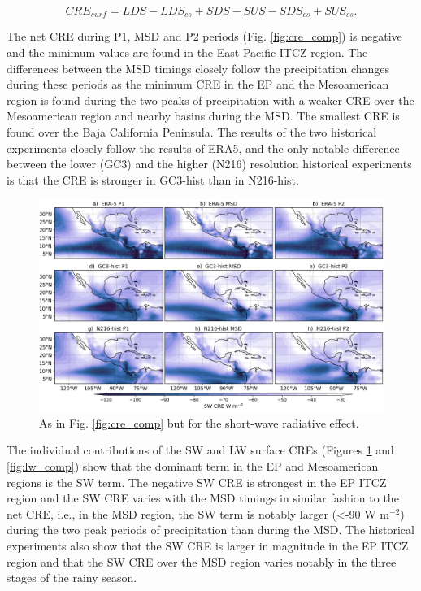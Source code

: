 \begin{equation}
CRE_{surf}=  LDS-LDS_{cs}+SDS-SUS-SDS_{cs}+SUS_{cs}.
\end{equation}

The net CRE during P1, MSD and P2 periods (Fig. \ref{fig:cre_comp}) is negative  and the minimum values are found in the East Pacific ITCZ region. The differences between the MSD timings closely follow the precipitation changes during these periods as the minimum CRE in the EP and the Mesoamerican region is found during the two peaks of precipitation with a weaker CRE over the Mesoamerican region and nearby basins during the MSD. The smallest CRE is found over the Baja California Peninsula. 
The results of the two historical experiments closely follow the results of ERA5, and the only notable difference between the lower (GC3) and the higher (N216) resolution historical experiments is that the CRE is stronger in GC3-hist than in N216-hist.

\begin{figure}[t!]
\includegraphics[width=\linewidth]{figures/fig4_swclim_3.png}
\caption[Short-wave cloud radiative effect composites]{As in Fig. \ref{fig:cre_comp} but for the short-wave radiative effect.}
\label{fig:sw_comp}
\end{figure}

The individual contributions of the SW and LW surface CREs (Figures \ref{fig:sw_comp} and \ref{fig:lw_comp}) show that the dominant term in the EP and Mesoamerican regions is the SW term. The negative SW CRE is strongest in the EP ITCZ region and the SW CRE varies with the MSD timings in similar fashion to the net CRE, i.e., in the MSD region, the SW term is notably larger (<-90 W m$^{-2}$) during the two peak periods of precipitation than during the MSD.
The historical experiments also show that the SW CRE is larger in magnitude in the EP ITCZ region and that the SW CRE over the MSD region varies notably in the three stages of the rainy season.

